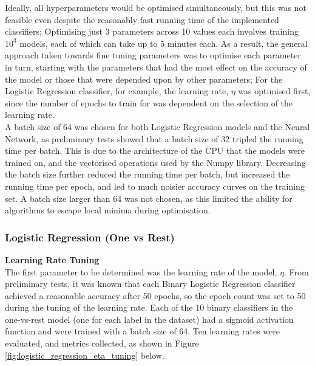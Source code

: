 \documentclass[11pt,a4paper]{article}
\begin{document}
\noindent Ideally, all hyperparameters would be optimised simultaneously, but this was not feasible even despite the reasonably fast running time of the implemented classifiers; Optimising just 3 parameters across 10 values each involves training $10^3$ models, each of which can take up to 5 minutes each. As a result, the general approach taken towards fine tuning parameters was to optimise each parameter in turn, starting with the parameters that had the most effect on the accuracy of the model or those that were depended upon by other parameters; For the Logistic Regression classifier, for example, the learning rate, $\eta$ was optimised first, since the number of epochs to train for was dependent on the selection of the learning rate.\\

\noindent A batch size of 64 was chosen for both Logistic Regression models and the Neural Network, as preliminary tests showed that a batch size of 32 tripled the running time per batch. This is due to the architecture of the CPU that the models were trained on, and the vectorised operations used by the Numpy library. Decreasing the batch size further reduced the running time per batch, but increased the running time per epoch, and led to much noisier accuracy curves on the training set. A batch size larger than 64 was not chosen, as this limited the ability for algorithms to escape local minima during optimisation.\\

\subsubsection*{Logistic Regression (One vs Rest)}

\noindent\textbf{Learning Rate Tuning}\\
The first parameter to be determined was the learning rate of the model, $\eta$. From preliminary tests, it was known that each Binary Logistic Regression classifier achieved a reasonable accuracy after 50 epochs, so the epoch count was set to 50 during the tuning of the learning rate. Each of the 10 binary classifiers in the one-vs-rest model (one for each label in the dataset) had a sigmoid activation function and were trained with a batch size of 64. Ten learning rates were evaluated, and metrics collected, as shown in Figure \ref{fig:logistic_regression_eta_tuning} below.
\end{document}
